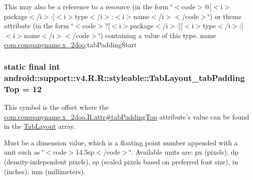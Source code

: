 This may also be a reference to a resource (in the form \char`\"{}$<$code$>$@\mbox{[}$<$i$>$package$<$/i$>$:\mbox{]}$<$i$>$type$<$/i$>$:$<$i$>$name$<$/i$>$$<$/code$>$\char`\"{}) or theme attribute (in the form \char`\"{}$<$code$>$?\mbox{[}$<$i$>$package$<$/i$>$:\mbox{]}\mbox{[}$<$i$>$type$<$/i$>$:\mbox{]}$<$i$>$name$<$/i$>$$<$/code$>$\char`\"{}) containing a value of this type.  name \hyperlink{namespacecom_1_1companyname_1_1x__2doo}{com.companyname.x\_\-2doo}:tabPaddingStart \hypertarget{classandroid_1_1support_1_1v4_1_1_r_1_1styleable_1bbc5410da0ccdca7252583408dbbb6a}{
\subsubsection[{TabLayout\_\-tabPaddingTop}]{\setlength{\rightskip}{0pt plus 5cm}static final int android::support::v4.R.R::styleable::TabLayout\_\-tabPaddingTop = 12}}
\label{classandroid_1_1support_1_1v4_1_1_r_1_1styleable_1bbc5410da0ccdca7252583408dbbb6a}


This symbol is the offset where the \hyperlink{classcom_1_1companyname_1_1x__2doo_1_1_r_1_1attr_e30f3321b748e9f13145e079c434833b}{com.companyname.x\_\-2doo.R.attr\#tabPaddingTop} attribute's value can be found in the \hyperlink{classandroid_1_1support_1_1v4_1_1_r_1_1styleable_d1f1104cdc4fac0ab4797d48f7efe351}{TabLayout} array.

Must be a dimension value, which is a floating point number appended with a unit such as \char`\"{}$<$code$>$14.5sp$<$/code$>$\char`\"{}. Available units are: px (pixels), dp (density-independent pixels), sp (scaled pixels based on preferred font size), in (inches), mm (millimeters). 

